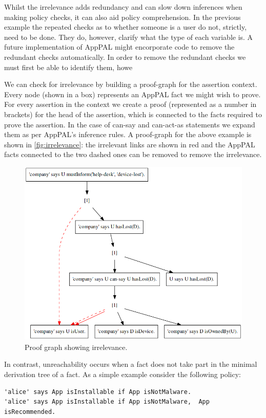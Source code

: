 \documentclass[thesis.tex]{subfiles}
\begin{document}
Whilst the irrelevance adds redundancy and can slow down inferences when making policy checks, it can also aid policy comprehension.  In the previous example the repeated checks as to whether someone is a user do not, strictly, need to be done.  They do, however, clarify what the type of each variable is.  A future implementation of AppPAL might encorporate code to remove the redundant checks automatically.  In order to remove the redundant checks we must first be able to identify them, howe

We can check for irrelevance by building a proof-graph for the
assertion context.  Every node (shown in a box) represents an AppPAL fact we
might wish to prove.  For every assertion in the context we create a proof
(represented as a number in brackets) for the head of the assertion, which is
connected to the facts required to prove the assertion.  In the case of can-say
and can-act-as statements we expand them as per AppPAL's inference rules.
A proof-graph for the above example is shown in \autoref{fig:irrelevance}: the
irrelevant links are shown in red and the AppPAL facts connected to the two
dashed ones can be removed to remove the irrelevance.

\begin{figure}
  \centering
  \includegraphics[width=0.5\linewidth]{./figures/irrelevance.png}
  \caption{Proof graph showing irrelevance.}
  \label{fig:irrelevance}
\end{figure}

In contrast, unreachability occurs when a fact does not take part in the minimal
derivation tree of a fact.  As a simple example consider the following policy:

\noindent\begin{minipage}{\textwidth}
\begin{lstlisting}
'alice' says App isInstallable if App isNotMalware.
'alice' says App isInstallable if App isNotMalware,  App isRecommended.
\end{lstlisting}
\end{minipage}
\end{document}
